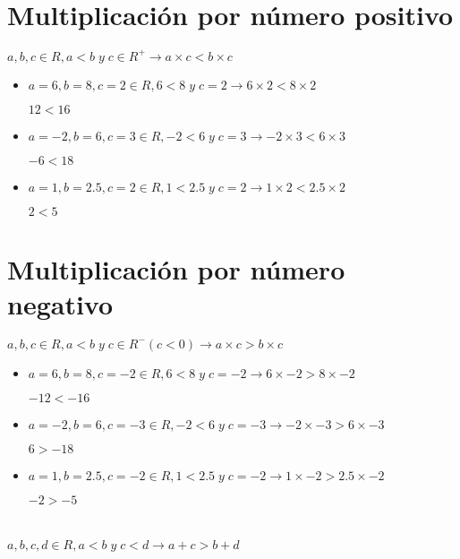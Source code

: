 \documentclass[12pt, letterpaper, twoside]{article}
\begin{document}
\section{Multiplicación por número positivo}

$a, b, c \in R, a < b \;y\; c \in R^+ \to a\times c < b\times c$

\begin{itemize}
    \item $a = 6, b = 8, c = 2 \in R, 6 < 8 \;y\; c = 2 \to 6\times 2 < 8\times 2$
    
    $12 < 16$

    \item $a = -2, b = 6, c = 3 \in R, -2 < 6 \;y\; c = 3 \to -2\times 3 < 6\times 3$
    
    $-6 < 18$

    \item $a = 1, b = 2.5, c = 2 \in R, 1 < 2.5 \;y\; c = 2 \to 1\times 2 < 2.5\times 2$

    $2 < 5$
\end{itemize}

\section{Multiplicación por número negativo}

$a, b, c \in R, a < b \;y\; c \in R^- (c < 0) \to a\times c > b\times c$

\begin{itemize}
    \item $a = 6, b = 8, c = -2 \in R, 6 < 8 \;y\; c = -2 \to 6\times -2 > 8\times -2$
    
    $-12 < -16$

    \item $a = -2, b = 6, c = -3 \in R, -2 < 6 \;y\; c = -3 \to -2\times -3 > 6\times -3$
    
    $6 > -18$

    \item $a = 1, b = 2.5, c = -2 \in R, 1 < 2.5 \;y\; c = -2 \to 1\times -2 > 2.5\times -2$

    $-2 > -5$
\end{itemize}

\section{}

$a, b, c, d \in R, a < b \;y\; c < d \to a + c > b + d$
\end{document}

